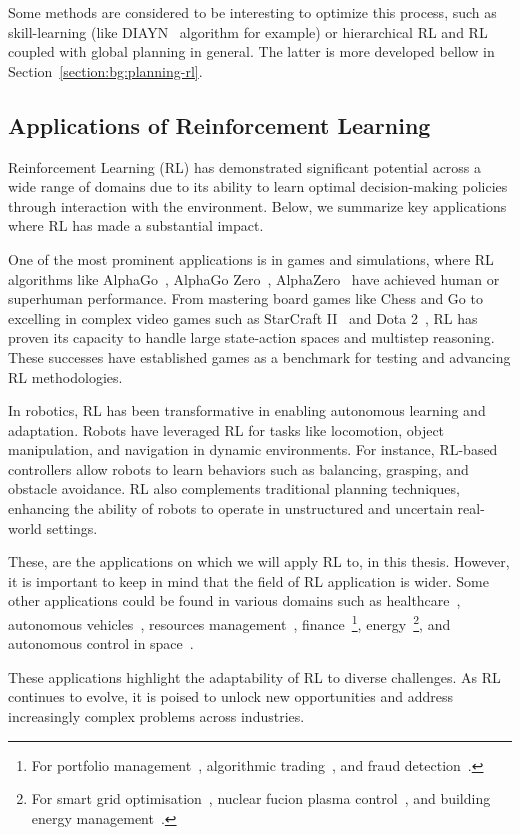 Some methods are considered to be interesting to optimize this process, such as skill-learning (like
DIAYN~\cite{eysenbach2018diversity} algorithm for example) or hierarchical RL and RL coupled with global planning in
general.
The latter is more developed bellow in Section~\ref{section:bg:planning-rl}.

\subsection{Applications of Reinforcement Learning}\label{subsection:bg:rl:applications-of-reinforcement-learning}
Reinforcement Learning (RL) has demonstrated significant potential across a wide range of domains due to its ability to
learn optimal decision-making policies through interaction with the environment.
Below, we summarize key applications where RL has made a substantial impact.

One of the most prominent applications is in games and simulations, where RL algorithms like
AlphaGo~\citep{silver2016mastering}, AlphaGo Zero~\citep{silver2017masteringgo},
AlphaZero~\citep{silver2017masteringchessandgo} have achieved human or superhuman performance.
From mastering board games like Chess and Go to excelling in complex video games such as
StarCraft II~\citep{vinyals2019grandmaster} and Dota 2~\citep{berner2019dota}, RL has
proven its capacity to handle large state-action spaces and multistep reasoning.
These successes have established games as a benchmark for testing and advancing RL methodologies.

In robotics, RL has been transformative in enabling autonomous learning and adaptation.
Robots have leveraged RL for tasks like locomotion, object manipulation, and navigation in dynamic environments.
For instance, RL-based controllers allow robots to learn behaviors such as balancing, grasping, and obstacle avoidance.
RL also complements traditional planning techniques, enhancing the ability of robots to operate in unstructured and
uncertain real-world settings.

These, are the applications on which we will apply RL to, in this thesis.
However, it is important to keep in mind that the field of RL application is wider.
Some other applications could be found in various domains such as healthcare~\citep{yu2021reinforcement},
autonomous vehicles~\citep{kiran2021deep}, resources management~\citep{mao2016resource}, finance~\footnote{For portfolio
management~\citep{jiang2017deep}, algorithmic trading~\citep{theate2021application}, and fraud
detection~\citep{el2017fraud}.},
energy~\footnote{For smart grid optimisation~\citep{zhang2018review}, nuclear fucion plasma
control~\citep{degrave2022magnetic}, and building energy management~\citep{yu2021review}.}, and autonomous control in
space~\citep{tipaldi2022reinforcement}.

These applications highlight the adaptability of RL to diverse challenges.
As RL continues to evolve, it is poised to unlock new opportunities and address increasingly complex problems across
industries.
